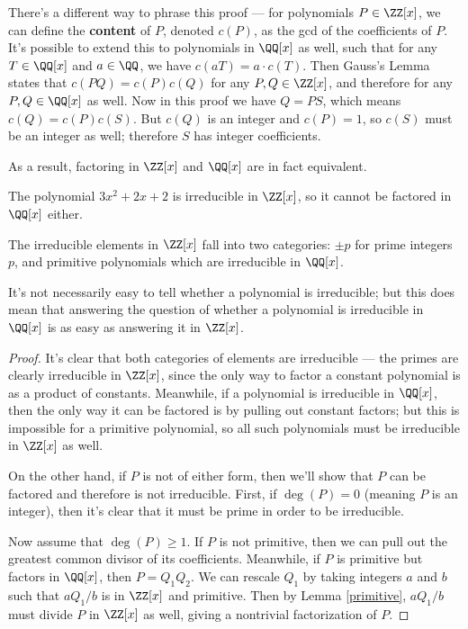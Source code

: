 \begin{note}
There's a different way to phrase this proof --- for polynomials $P \in \ZZ[x]$, we can define the \textbf{content} of $P$, denoted $c(P)$, as the gcd of the coefficients of $P$. It's possible to extend this to polynomials in $\QQ[x]$ as well, such that for any $T \in \QQ[x]$ and $a \in \QQ$, we have $c(aT) = a\cdot c(T)$. Then Gauss's Lemma states that $c(PQ) = c(P)c(Q)$ for any $P, Q \in \ZZ[x]$, and therefore for any $P, Q \in \QQ[x]$ as well. Now in this proof we have $Q = PS$, which means $c(Q) = c(P)c(S)$. But $c(Q)$ is an integer and $c(P) = 1$, so $c(S)$ must be an integer as well; therefore $S$ has integer coefficients. %
\end{note}

As a result, factoring in $\ZZ[x]$ and $\QQ[x]$ are in fact equivalent.

\begin{example}
    The polynomial $3x^2 + 2x + 2$ is irreducible in $\ZZ[x]$, so it cannot be factored in $\QQ[x]$ either. 
\end{example}

\begin{corollary}
The irreducible elements in $\ZZ[x]$ fall into two categories: $\pm p$ for prime integers $p$, and primitive polynomials which are irreducible in $\QQ[x]$. 
\end{corollary}

It's not necessarily easy to tell whether a polynomial is irreducible; but this does mean that answering the question of whether a polynomial is irreducible in $\QQ[x]$ is as easy as answering it in $\ZZ[x]$. 

\begin{proof}
It's clear that both categories of elements are irreducible --- the primes are clearly irreducible in $\ZZ[x]$, since the only way to factor a constant polynomial is as a product of constants. Meanwhile, if a polynomial is irreducible in $\QQ[x]$, then the only way it can be factored is by pulling out constant factors; but this is impossible for a primitive polynomial, so all such polynomials must be irreducible in $\ZZ[x]$ as well.  

On the other hand, if $P$ is not of either form, then we'll show that $P$ can be factored and therefore is not irreducible. First, if $\deg(P) = 0$ (meaning $P$ is an integer), then it's clear that it must be prime in order to be irreducible. 

Now assume that $\deg(P) \geq 1$. If $P$ is not primitive, then we can pull out the greatest common divisor of its coefficients. Meanwhile, if $P$ is primitive but factors in $\QQ[x]$, then $P = Q_1Q_2$. We can rescale $Q_1$ by taking integers $a$ and $b$ such that $aQ_1/b$ is in $\ZZ[x]$ and primitive. Then by Lemma \ref{primitive}, $aQ_1/b$ must divide $P$ in $\ZZ[x]$ as well, giving a nontrivial factorization of $P$. 
\end{proof}

